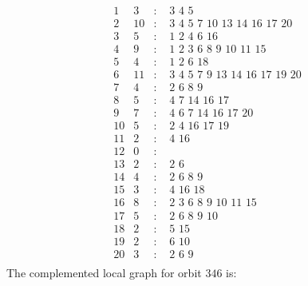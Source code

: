 \documentclass[12pt]{article}
\begin{document}
\begin{equation*}
\begin{array}{rrcl}
1&3&:&\,\,3\,\,4\,\,5\\
2&10&:&\,\,3\,\,4\,\,5\,\,7\,\,10\,\,13\,\,14\,\,16\,\,17\,\,20\\
3&5&:&\,\,1\,\,2\,\,4\,\,6\,\,16\\
4&9&:&\,\,1\,\,2\,\,3\,\,6\,\,8\,\,9\,\,10\,\,11\,\,15\\
5&4&:&\,\,1\,\,2\,\,6\,\,18\\
6&11&:&\,\,3\,\,4\,\,5\,\,7\,\,9\,\,13\,\,14\,\,16\,\,17\,\,19\,\,20\\
7&4&:&\,\,2\,\,6\,\,8\,\,9\\
8&5&:&\,\,4\,\,7\,\,14\,\,16\,\,17\\
9&7&:&\,\,4\,\,6\,\,7\,\,14\,\,16\,\,17\,\,20\\
10&5&:&\,\,2\,\,4\,\,16\,\,17\,\,19\\
11&2&:&\,\,4\,\,16\\
12&0&:&\\
13&2&:&\,\,2\,\,6\\
14&4&:&\,\,2\,\,6\,\,8\,\,9\\
15&3&:&\,\,4\,\,16\,\,18\\
16&8&:&\,\,2\,\,3\,\,6\,\,8\,\,9\,\,10\,\,11\,\,15\\
17&5&:&\,\,2\,\,6\,\,8\,\,9\,\,10\\
18&2&:&\,\,5\,\,15\\
19&2&:&\,\,6\,\,10\\
20&3&:&\,\,2\,\,6\,\,9\\
\end{array}
\end{equation*}
The complemented local graph for orbit $346$ is:
\end{document}
